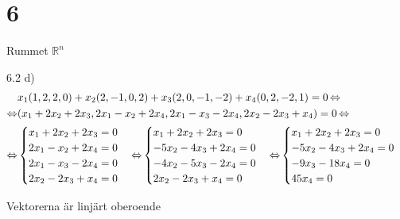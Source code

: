 \chapter{6}{Rummet $\mathbb{R}^n$}
\begin{task}{6.2 d)}
	\begin{align*}
		&x_1(1,2,2,0)+x_2(2,-1,0,2)+x_3(2,0,-1,-2)+x_4(0,2,-2,1)=0 \operatorname{\Leftrightarrow} \\ \operatorname{\Leftrightarrow}
		&(x_1+2x_2+2x_3,2x_1-x_2+2x_4,2x_1-x_3-2x_4,2x_2-2x_3+x_4)=0 \operatorname{\Leftrightarrow} \\ \operatorname{\Leftrightarrow}
		&\begin{cases}
			x_1+2x_2+2x_3=0 \\
			2x_1-x_2+2x_4=0 \\
			2x_1-x_3-2x_4=0 \\
			2x_2-2x_3+x_4=0
		\end{cases} \operatorname{\Leftrightarrow}
		\begin{cases}
			x_1+2x_2+2x_3=0 \\
			-5x_2-4x_3+2x_4=0 \\
			-4x_2-5x_3-2x_4=0 \\
			2x_2-2x_3+x_4=0
		\end{cases} \operatorname{\Leftrightarrow}
		\begin{cases}
			x_1+2x_2+2x_3=0 \\
			-5x_2-4x_3+2x_4=0 \\
			-9x_3-18x_4=0 \\
			45x_4=0
		\end{cases}
	\end{align*}
	
	\ans Vektorerna är linjärt oberoende
\end{task}